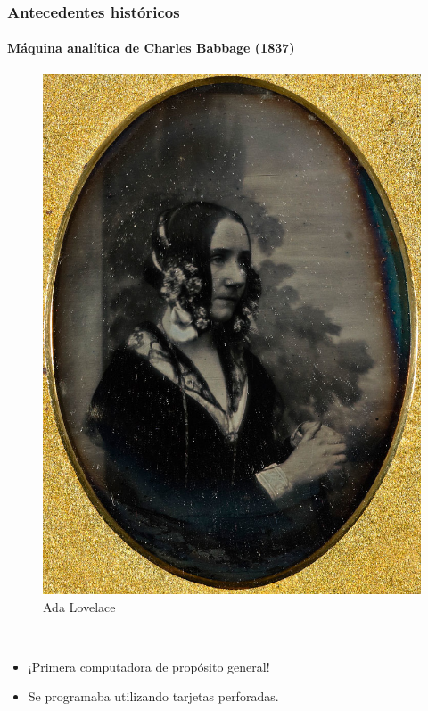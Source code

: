 \documentclass[11pt,a4paper,spanish]{beamer}
\begin{document}
\begin{frame}

\frametitle{Antecedentes históricos}
\framesubtitle{Máquina analítica de Charles Babbage (1837)}

\begin{minipage}{0.2\textwidth}
    \centering
    \begin{figure}
        \includegraphics[width=1.0\textwidth]{img/ada.jpg}
        \captionsetup{textfont=tiny,labelformat=empty}
        \caption{Ada Lovelace}
    \end{figure}
\end{minipage}
~
\begin{minipage}{0.55\textwidth}
    \centering
    \begin{itemize}
        \item ¡Primera computadora de propósito general!
        \item Se programaba utilizando tarjetas perforadas.

\end{itemize}
\end{minipage}
\end{frame}
\end{document}
